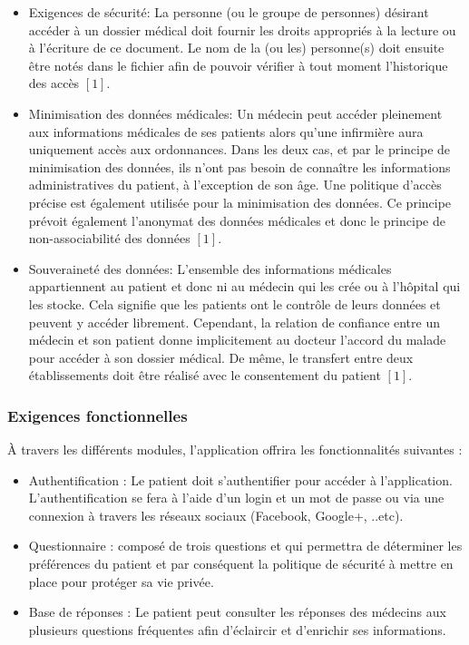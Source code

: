 \begin{itemize}
	\item Exigences de sécurité: La personne (ou le groupe de personnes) désirant accéder à un dossier médical doit fournir les droits appropriés à la lecture ou à l’écriture de ce document. Le nom de la (ou les) personne(s) doit ensuite être notés dans le fichier afin de pouvoir vérifier à tout moment l’historique des accès $[1]$.

  \item Minimisation des données médicales: Un médecin peut accéder pleinement aux informations médicales de ses patients alors qu’une infirmière aura uniquement accès aux ordonnances. Dans les deux cas, et par le principe de minimisation des données, ils n’ont pas besoin de connaître les informations administratives du patient, à l’exception de son âge. Une politique d’accès précise est également utilisée pour la minimisation des données. Ce principe prévoit également l’anonymat des données médicales et donc le principe de non-associabilité des données $[1]$.

	\item Souveraineté des données: L’ensemble des informations médicales appartiennent au patient et donc ni au médecin qui les crée ou à l’hôpital qui les stocke. Cela signifie que les patients ont le contrôle de leurs données et peuvent y accéder librement. Cependant, la relation de confiance entre
un médecin et son patient donne implicitement au docteur l’accord du malade pour accéder à son dossier médical. De même, le transfert entre deux établissements doit être réalisé avec le consentement du patient $[1]$.
\end{itemize}

\subsubsection{Exigences fonctionnelles}

À travers les différents modules, l'application offrira les fonctionnalités suivantes :

\vspace{6pt}
\paragraphmark

\begin{itemize}
	\item Authentification : Le patient doit s’authentifier pour accéder à l'application. L’authentification se fera à l’aide d’un login et un mot de passe ou via une connexion à travers les réseaux sociaux (Facebook, Google+, ..etc).
	\item Questionnaire : composé de trois questions et qui permettra de déterminer les préférences du patient et par conséquent la politique de sécurité à mettre en place pour protéger sa vie privée.
	\item Base de réponses : Le patient peut consulter les réponses des médecins aux plusieurs questions fréquentes afin d'éclaircir et d'enrichir ses informations.
\end{itemize}

